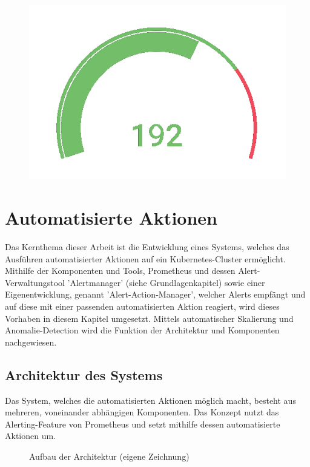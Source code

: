 \documentclass[a4paper,10pt]{scrartcl}
\begin{document}
\begin{figure}[htbp]
\includegraphics[scale=.8]{img/PercantageTransparent.png}
\end{figure}

\pagebreak
\section{Automatisierte Aktionen}

Das Kernthema dieser Arbeit ist die Entwicklung eines Systems, welches das Ausführen automatisierter Aktionen auf ein Kubernetes-Cluster ermöglicht. Mithilfe der Komponenten und Tools, Prometheus und dessen Alert-Verwaltungstool 'Alertmanager' (siehe Grundlagenkapitel) sowie einer Eigenentwicklung, genannt 'Alert-Action-Manager', welcher Alerts empfängt und auf diese mit einer passenden automatisierten Aktion reagiert, wird dieses Vorhaben in diesem Kapitel umgesetzt. Mittels automatischer Skalierung und Anomalie-Detection wird die Funktion der Architektur und Komponenten nachgewiesen.



\pagebreak
\subsection{Architektur des Systems}

Das System, welches die automatisierten Aktionen möglich macht, besteht aus mehreren, voneinander abhängigen Komponenten. Das Konzept nutzt das Alerting-Feature von Prometheus und setzt mithilfe dessen automatisierte Aktionen um.\\

\begin{figure}[htbp]
  \centering
  \scalebox{.6}{}
  \caption{Aufbau der Architektur (eigene Zeichnung)}
\end{figure}
\end{document}
